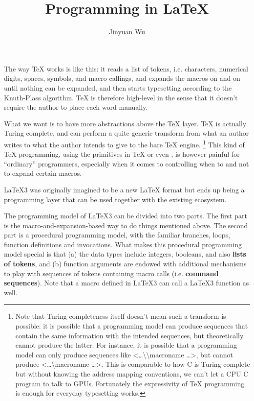 \documentclass[hyperref, a4paper, 12pt]{article}
\title{Programming in LaTeX}
\author{Jinyuan Wu}
\newcommand*{\concept}[1]{{\textbf{#1}}}
\def\texttt#1{<#1>}%
\newcommand{\shortcode}[1]{\texttt{#1}}
\begin{document}
\maketitle


The way \TeX{} works is like this:
it reads a list of tokens, i.e. characters, numerical digits, spaces, symbols, and macro callings,
and expands the macros on and on until nothing can be expanded,
and then starts typesetting according to the Knuth-Plass algorithm.
\TeX{} is therefore high-level in the sense that it doesn't require the author
to place each word manually.

What we want is to have more abstractions above the \TeX{} layer.
\TeX{} is actually Turing complete, and can perform a quite generic transform from
what an author writes to what the author intends to give to the bare \TeX{} engine.%
\footnote{
    Note that Turing completeness itself doesn't mean such a transform is possible:
    it is possible that a programming model can produce sequences that contain the same information
    with the intended sequences,
    but theoretically cannot produce the latter.
    For instance, it is possible that a programming model can only produce sequences like 
    \shortcode{\dots \textbackslash \textbackslash macroname \dots},
    but cannot produce \shortcode{\dots \textbackslash macroname \dots}.
    This is comparable to how C is Turing-complete but without knowing the address mapping conventions,
    we can't let a CPU C program to talk to GPUs.
    Fortunately the expressivity of \TeX{} programming is enough for everyday typesetting works.
}
This kind of \TeX{} programming, using the primitives in \TeX{} or even \LaTeXe,
is however painful for ``ordinary'' programmers,
especially when it comes to controlling when to and not to expand certain macros.

\LaTeX 3 was originally imagined to be a new \LaTeX{} format but ends up being a programming layer
that can be used together with the existing \LaTeXe{} ecosystem.

The programming model of \LaTeX 3 can be divided into two parts.
The first part is the macro-and-expansion-based way to do things mentioned above.
The second part is a procedural programming model,
with the familiar branches, loops, function definitions and invocations.
What makes this procedural programming model special 
is that (a) the data types include integers, booleans, and also \concept{lists of tokens},
and (b) function arguments are endowed with additional mechanisms to 
play with sequences of tokens containing macro calls (i.e. \concept{command sequences}).
Note that a macro defined in \LaTeX 3 can call a \LaTeX 3 function as well.
\end{document}
